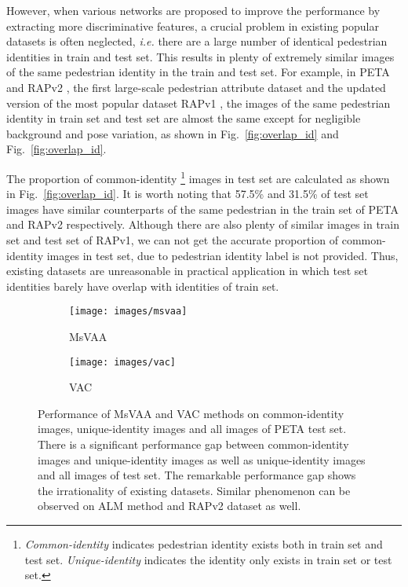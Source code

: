 \documentclass[runningheads]{llncs}
\begin{document}
However, when various networks are proposed to improve the performance by extracting more discriminative features, a crucial problem in existing popular datasets is often neglected, \textit{i.e.} there are a large number of identical pedestrian identities in train and test set. This results in plenty of extremely similar images of the same pedestrian identity in the train and test set. For example, in PETA \cite{deng2014pedestrian} and RAPv2 \cite{li2018richly}, the first large-scale pedestrian attribute dataset and the updated version of the most popular dataset RAPv1 \cite{li2016richly}, the images of the same pedestrian identity in train set and test set are almost the same except for negligible background and pose variation, as shown in Fig.~\ref{fig:overlap_id} and Fig.~\ref{fig:overlap_id}.

The proportion of common-identity \footnote{\textit{Common-identity} indicates pedestrian identity exists both in train set and test set. \textit{Unique-identity} indicates the identity only exists in train set or test set.} images in test set are calculated as shown in Fig.~\ref{fig:overlap_id}. It is worth noting that 57.5\% and 31.5\% of test set images have similar counterparts of the same pedestrian in the train set of PETA and RAPv2 respectively. Although there are also plenty of similar images in train set and test set of RAPv1, we can not get the accurate proportion of common-identity images in test set, due to pedestrian identity label is not provided. Thus, existing datasets are unreasonable in practical application in which test set identities barely have overlap with identities of train set. 

\begin{figure}[h]
	\centering
	\begin{subfigure}[b]{0.49\linewidth}
         \centering
         \texttt{[image: images/msvaa]}
         \caption{MsVAA}
         \label{fig:overlap_id1}
     \end{subfigure}
     \hfill
     \begin{subfigure}[b]{0.49\linewidth}
         \centering
         \texttt{[image: images/vac]}
         \caption{VAC}
         \label{fig:overlap_id2}
     \end{subfigure}
     \caption{Performance of MsVAA \cite{sarafianos2018deep} and VAC \cite{guo2019visual} methods on common-identity images, unique-identity images and all images of PETA test set. There is a significant performance gap between common-identity images and unique-identity images as well as unique-identity images and all images of test set. The remarkable performance gap shows the irrationality of existing datasets. Similar phenomenon can be observed on ALM \cite{tang2019Improving} method and RAPv2 dataset as well.}
     \label{fig:overlapped_img_gap_msvaa}
     \vspace{-.5em}
\end{figure}
\end{document}
